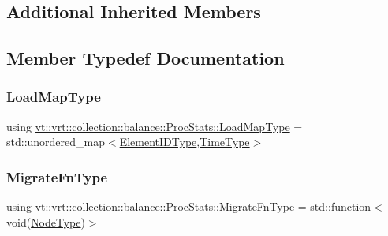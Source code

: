 \subsection*{Additional Inherited Members}


\subsection{Member Typedef Documentation}
\mbox{\label{structvt_1_1vrt_1_1collection_1_1balance_1_1_proc_stats_aa810fd21680061ec5d50f6526f66be31}} 
\subsubsection{\texorpdfstring{Load\+Map\+Type}{LoadMapType}}
{\footnotesize\ttfamily using \hyperlink{structvt_1_1vrt_1_1collection_1_1balance_1_1_proc_stats_aa810fd21680061ec5d50f6526f66be31}{vt\+::vrt\+::collection\+::balance\+::\+Proc\+Stats\+::\+Load\+Map\+Type} =  std\+::unordered\+\_\+map$<$\hyperlink{namespacevt_1_1vrt_1_1collection_1_1balance_a14c8d2c972f2913aa3f1636e5be0a120}{Element\+I\+D\+Type},\hyperlink{namespacevt_a876a9d0cd5a952859c72de8a46881442}{Time\+Type}$>$}

\mbox{\label{structvt_1_1vrt_1_1collection_1_1balance_1_1_proc_stats_a7cb065ac4de218cb717bc2634782f0cb}} 
\subsubsection{\texorpdfstring{Migrate\+Fn\+Type}{MigrateFnType}}
{\footnotesize\ttfamily using \hyperlink{structvt_1_1vrt_1_1collection_1_1balance_1_1_proc_stats_a7cb065ac4de218cb717bc2634782f0cb}{vt\+::vrt\+::collection\+::balance\+::\+Proc\+Stats\+::\+Migrate\+Fn\+Type} =  std\+::function$<$void(\hyperlink{namespacevt_a866da9d0efc19c0a1ce79e9e492f47e2}{Node\+Type})$>$}

